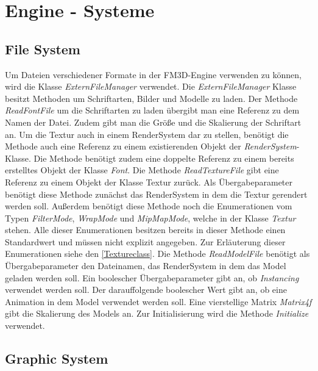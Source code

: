 \section{Engine - Systeme}


\subsection{File System}
Um Dateien verschiedener Formate in der FM3D-Engine verwenden zu können, wird die Klasse \textit{ExternFileManager} verwendet.
Die \textit{ExternFileManager} Klasse besitzt Methoden um Schriftarten, Bilder und Modelle zu laden. Der Methode \textit{ReadFontFile} um die Schriftarten zu laden übergibt man eine Referenz zu dem Namen der Datei. Zudem gibt man die Größe und die Skalierung der Schriftart an. Um die Textur auch in einem RenderSystem dar zu stellen, benötigt die Methode auch eine Referenz zu einem existierenden Objekt der \textit{RenderSystem}-Klasse. Die Methode benötigt zudem eine doppelte Referenz zu einem bereits erstelltes Objekt der Klasse \textit{Font}. 
Die Methode \textit{ReadTextureFile} gibt eine Referenz zu einem Objekt der Klasse Textur zurück. Als Übergabeparameter benötigt diese Methode zunächst das RenderSystem in dem die Textur gerendert werden soll. Außerdem benötigt diese Methode noch  die Enumerationen vom Typen \textit{FilterMode}, \textit{WrapMode} und \textit{MipMapMode}, welche in der Klasse \textit{Textur} stehen. Alle dieser Enumerationen besitzen bereits in dieser Methode einen Standardwert und müssen nicht explizit angegeben. Zur Erläuterung dieser Enumerationen siehe den \cref{Textureclass}. 
Die Methode \textit{ReadModelFile} benötigt als Übergabeparameter den Dateinamen, das RenderSystem in dem das Model geladen werden soll. Ein boolescher Übergabeparameter gibt an, ob \textit{Instancing} verwendet werden soll. Der darauffolgende  boolescher Wert gibt an, ob eine Animation in dem Model verwendet werden soll. Eine vierstellige Matrix \textit{Matrix4f} gibt die Skalierung des Models an.
Zur Initialisierung wird die Methode \textit{Initialize} verwendet.

\subsection{Graphic System}

